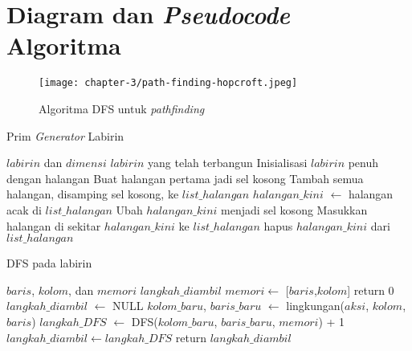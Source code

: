 \chapter{Diagram dan \textit{Pseudocode} Algoritma}

\begin{figure}[H]
	\centering
	\texttt{[image: chapter-3/path-finding-hopcroft.jpeg]}
	\caption{Algoritma \ac{DFS} untuk \textit{pathfinding} \parencite{hopcroft1973algorithm}}
	\label{fig:hopcroft-dfs}
\end{figure}

\begin{algorithm}
	\makeatletter
	\renewcommand{\ALG@name}{Algoritma}
	\makeatother
	\caption{Prim \textit{Generator} Labirin}\label{alg:prim}
	\renewcommand{\algorithmicrequire}{\textbf{Masukan:}}
	\renewcommand{\algorithmicensure}{\textbf{Keluaran:}}
	\begin{algorithmic}[1]
		\Require $labirin$ dan $dimensi$
		\Ensure $labirin$ yang telah terbangun
		\State Inisialisasi $labirin$ penuh dengan halangan
		\State Buat halangan pertama jadi sel kosong
		\State Tambah semua halangan, disamping sel kosong, ke $list\_halangan$
		\State $halangan\_kini$ $\gets$ halangan acak di $list\_halangan$
		\State Ubah $halangan\_kini$ menjadi sel kosong
		\State Masukkan halangan di sekitar $halangan\_kini$ ke $list\_halangan$
		\EndIf
		\State hapus $halangan\_kini$ dari $list\_halangan$
		\EndWhile
	\end{algorithmic}
\end{algorithm}


\begin{algorithm}
	\makeatletter
	\renewcommand{\ALG@name}{Algoritma}
	\makeatother
	\caption{\ac{DFS} pada labirin}\label{alg:dfs-sw}
	\renewcommand{\algorithmicrequire}{\textbf{Masukan:}}
	\renewcommand{\algorithmicensure}{\textbf{Keluaran:}}
	\begin{algorithmic}[1]
		\Require $baris$, $kolom$, dan $memori$
		\Ensure $langkah\_diambil$
		\State $memori \gets$ [$baris$,$kolom$]
		\State return 0 \EndIf
		\State $langkah\_diambil$ $\gets$ NULL
		\State $kolom\_baru$, $baris\_baru$ $\gets$ lingkungan($aksi$, $kolom$, $baris$)
		\State $langkah\_DFS$ $\gets$ DFS($kolom\_baru$, $baris\_baru$, $memori$) + 1
		\State $langkah\_diambil \gets langkah\_DFS$
		\EndIf
		\EndIf
		\EndFor
		\State return $langkah\_diambil$
	\end{algorithmic}
\end{algorithm}

